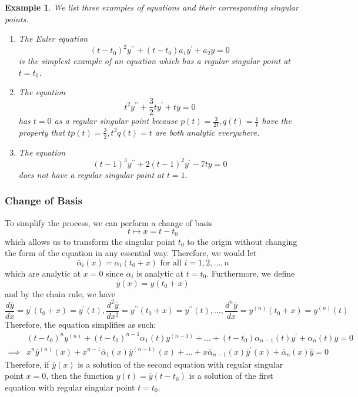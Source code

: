 \documentclass{article}
\newtheorem{example}{Example}[section]
\theoremstyle{remark}
\theoremstyle{definition}
\begin{document}
    \begin{example}
    We list three examples of equations and their corresponding singular points. 
    \begin{enumerate}
        \item The Euler equation 
        \[(t - t_0)^2 y^{\prime\prime} + (t - t_0) a_1 y^\prime + a_2 y = 0\]
        is the simplest example of an equation which has a regular singular point at $t = t_0$. 
        \item The equation 
        \[t^2 y^{\prime\prime} + \frac{3}{2} t y^\prime + ty = 0\]
        has $t = 0$ as a regular singular point because $p(t) = \frac{3}{2t}, q(t) = \frac{1}{t}$ have the property that $t p(t) = \frac{3}{2}, t^2 q(t) = t$ are both analytic everywhere.
        \item The equation 
        \[(t-1)^3 y^{\prime\prime} + 2(t-1)^2 y^\prime - 7ty = 0\]
        does not have a regular singular point at $t = 1$. 
    \end{enumerate}
    \end{example}

    \subsubsection{Change of Basis}

      To simplify the process, we can perform a change of basis 
      \[t \mapsto x = t - t_0\]
      which allows us to transform the singular point $t_0$ to the origin without changing the form of the equation in any essential way. Therefore, we would let 
      \[\overline{\alpha}_i (x) = \alpha_i (t_0 + x) \text{ for all } i = 1, 2, \ldots, n\]
      which are analytic at $x = 0$ since $\alpha_i$ is analytic at $t = t_0$. Furthermore, we define
      \[\overline{y}(x) = y (t_0 + x)\]
      and by the chain rule, we have
      \[\frac{d \overline{y}}{dx} = y^\prime (t_0 + x) = y^\prime (t), \frac{d^2 \overline{y}}{dx^2} = y^{\prime\prime} (t_0 + x) = y^{\prime\prime} (t), \ldots, \frac{d^n \overline{y}}{dx} = y^{(n)} (t_0 + x) = y^{(n)} (t)\]
      Therefore, the equation simplifies as such: 
      \begin{align}
          & (t - t_0)^n y^{(n)} + (t - t_0)^{n-1} \alpha_1 (t) y^{(n-1)} + \ldots + (t - t_0) \alpha_{n-1} (t) y^\prime + \alpha_n (t) y = 0 \\
          \implies & x^n \bar{y}^{(n)}(x) + x^{n-1} \bar{\alpha}_1(x) \bar{y}^{(n-1)} (x) + \ldots + x \bar{\alpha}_{n-1} (x) \bar{y}^\prime (x) + \bar{\alpha}_n (x) \bar{y} = 0
      \end{align}
      Therefore, if $\bar{y}(x)$ is a solution of the second equation with regular singular point $x = 0$, then the function $y(t) = \bar{y} (t - t_0)$ is a solution of the first equation with regular singular point $t = t_0$. 
\end{document}
